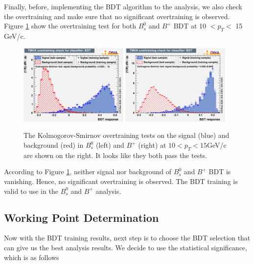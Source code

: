 Finally, before, implementing the BDT algorithm to the analysis, we also check the overtraining and make sure that no significant overtraining is observed. Figure \ref{OverTraining} show the overtraining test for both $B^0_s$ and $B^+$ BDT at 10 $< p_T < $ 15 GeV/c. 


\begin{figure}[h]
\begin{center}
\includegraphics[width= 0.48\textwidth]{Figures/Chapter5/BsOT.eps}
\includegraphics[width= 0.48\textwidth]{Figures/Chapter5/BPOT.pdf}
\caption{The Kolmogorov-Smirnov overtraining tests on the signal (blue) and background (red) in $B^0_s$ (left) and $B^+$ (right) at $10 < p_T < 15$GeV/c are shown on the right. It looks like they both pass the tests.}
\label{OverTraining}
\end{center}
\end{figure}

According to Figure \ref{OverTraining}, neither signal nor background of $B^0_s$ and $B^+$ BDT is vanishing. Hence, no significant overtraining is observed. The BDT training is valid to use in the $B^0_s$ and $B^+$ analysis.


\subsection{Working Point Determination}

Now with the BDT training results, next step is to choose the BDT selection that can give us the best analysis results. We decide to use the statistical significance, which is as follows

